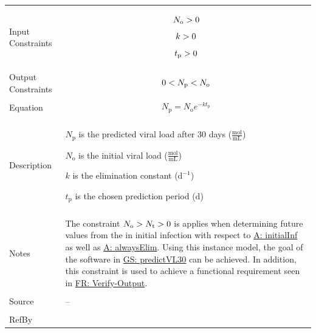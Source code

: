 \documentclass[12pt]{article}
\newcommand{\gt}{\ensuremath >}
\newcommand{\lt}{\ensuremath <}
\begin{document}
\begin{minipage}{\textwidth}
\begin{tabular}{>{\raggedright}p{}>{\raggedright\arraybackslash}p{}}
\\ \midrule \\
Input Constraints & \begin{displaymath}
                    {N_{\text{o}}}\gt{}0
                    \end{displaymath}
                    \begin{displaymath}
                    k\gt{}0
                    \end{displaymath}
                    \begin{displaymath}
                    {t_{\text{p}}}\gt{}0
                    \end{displaymath}
\\ \midrule \\
Output Constraints & \begin{displaymath}
                     0\lt{}{N_{\text{p}}}\lt{}{N_{\text{o}}}
                     \end{displaymath}
\\ \midrule \\
Equation & \begin{displaymath}
           {N_{\text{p}}}={N_{\text{o}}} e^{-k {t_{\text{p}}}}
           \end{displaymath}
\\ \midrule \\
Description & \begin{symbDescription}
              \item{${N_{\text{p}}}$ is the predicted viral load after 30 days ($\frac{\text{mol}}{\text{mL}}$)}
              \item{${N_{\text{o}}}$ is the initial viral load ($\frac{\text{mol}}{\text{mL}}$)}
              \item{$k$ is the elimination constant ($\text{d}^{-1}$)}
              \item{${t_{\text{p}}}$ is the chosen prediction period (${\text{d}}$)}
              \end{symbDescription}
\\ \midrule \\
Notes & The constraint ${N_{\text{o}}}\gt{}{N_{\text{t}}}\gt{}0$ is  applies when determining future values from the in initial infection with respect to \hyperref[initialInf]{A: initialInf} as well as  \hyperref[alwaysElim]{A: alwaysElim}. Using this instance model, the goal of the software in  \hyperref[predictVL30]{GS: predictVL30}  can be achieved. In addition, this constraint is used to achieve a functional requirement seen in  \hyperref[verifyOutput]{FR: Verify-Output}.
        
\\ \midrule \\
Source & --
         
\\ \midrule \\
RefBy & 
\\ \bottomrule
\end{tabular}
\end{minipage}
\end{document}
